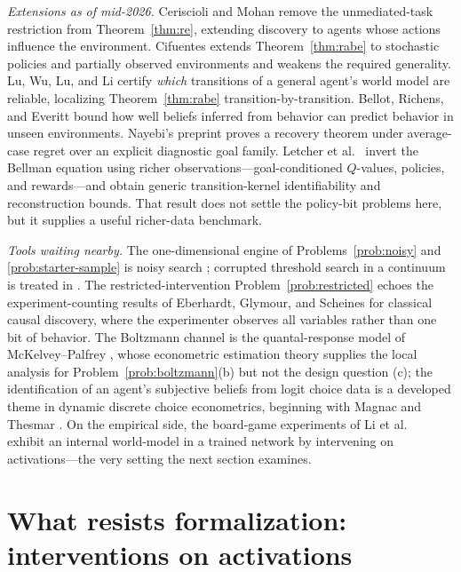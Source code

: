 \documentclass[11pt]{amsart}
\theoremstyle{plain}
\theoremstyle{definition}
\begin{document}
\emph{Extensions as of mid-2026.} Ceriscioli and Mohan \cite{ceriscioli2025} remove the unmediated-task restriction from Theorem~\ref{thm:re}, extending discovery to agents whose actions influence the environment. Cifuentes \cite{cifuentes2026} extends Theorem~\ref{thm:rabe} to stochastic policies and partially observed environments and weakens the required generality. Lu, Wu, Lu, and Li \cite{lu2026} certify \emph{which} transitions of a general agent's world model are reliable, localizing Theorem~\ref{thm:rabe} transition-by-transition. Bellot, Richens, and Everitt \cite{bellot2025} bound how well beliefs inferred from behavior can predict behavior in unseen environments. Nayebi's preprint \cite{nayebi2026} proves a recovery theorem under average-case regret over an explicit diagnostic goal family. Letcher et al.\ \cite{letcher2026} invert the Bellman equation using richer observations---goal-conditioned $Q$-values, policies, and rewards---and obtain generic transition-kernel identifiability and reconstruction bounds. That result does not settle the policy-bit problems here, but it supplies a useful richer-data benchmark.

\emph{Tools waiting nearby.} The one-dimensional engine of Problems~\ref{prob:noisy} and \ref{prob:starter-sample} is noisy search \cite{rivest1980,feige1994,benor2008,karp2007}; corrupted threshold search in a continuum is treated in \cite{krishnamurthy2021}. The restricted-intervention Problem~\ref{prob:restricted} echoes the experiment-counting results of Eberhardt, Glymour, and Scheines \cite{eberhardt2005} for classical causal discovery, where the experimenter observes all variables rather than one bit of behavior. The Boltzmann channel is the quantal-response model of McKelvey--Palfrey \cite{mckelvey1995}, whose econometric estimation theory supplies the local analysis for Problem~\ref{prob:boltzmann}(b) but not the design question (c); the identification of an agent's subjective beliefs from logit choice data is a developed theme in dynamic discrete choice econometrics, beginning with Magnac and Thesmar \cite{magnac2002}. On the empirical side, the board-game experiments of Li et al.\ \cite{li2023} exhibit an internal world-model in a trained network by intervening on activations---the very setting the next section examines.

\section{What resists formalization: interventions on activations}\label{sec:obstruction}
\end{document}
